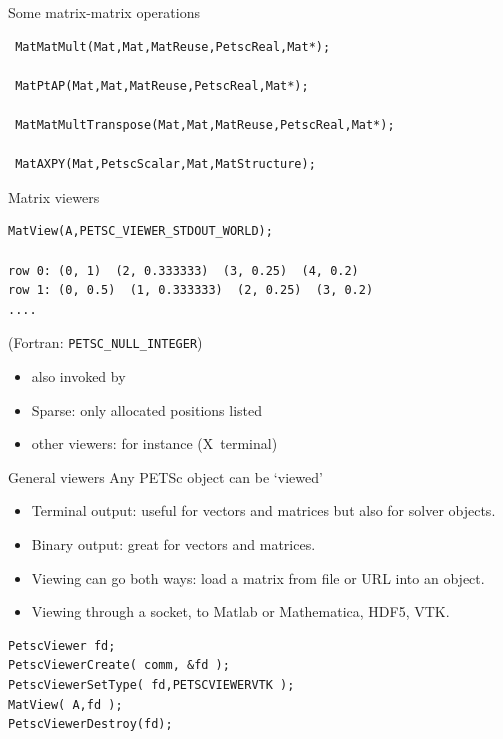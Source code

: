 \begin{longstory}

\begin{numberedframe}{Some matrix-matrix operations}
\begin{lstlisting}
 MatMatMult(Mat,Mat,MatReuse,PetscReal,Mat*);

 MatPtAP(Mat,Mat,MatReuse,PetscReal,Mat*);

 MatMatMultTranspose(Mat,Mat,MatReuse,PetscReal,Mat*);

 MatAXPY(Mat,PetscScalar,Mat,MatStructure);
\end{lstlisting}
\end{numberedframe}

\begin{details}
\begin{numberedframe}{Matrix viewers}
\begin{lstlisting}
MatView(A,PETSC_VIEWER_STDOUT_WORLD);

row 0: (0, 1)  (2, 0.333333)  (3, 0.25)  (4, 0.2)
row 1: (0, 0.5)  (1, 0.333333)  (2, 0.25)  (3, 0.2)
....
\end{lstlisting}
(Fortran: \lstinline{PETSC_NULL_INTEGER})
  \begin{itemize}
  \item also invoked by 
  \item Sparse: only allocated positions listed
  \item other viewers: for instance  (X~terminal)
  \end{itemize}
\end{numberedframe}
\end{details}

\begin{numberedframe}{General viewers}
  Any PETSc object can be `viewed'
  \begin{itemize}
  \item Terminal output: useful for vectors and matrices but also for
    solver objects.
  \item Binary output: great for vectors and matrices.
  \item Viewing can go both ways: load a matrix from file or URL into
    an object.
  \item Viewing through a socket, to Matlab or Mathematica, HDF5, VTK.
  \end{itemize}
\begin{lstlisting}
PetscViewer fd;
PetscViewerCreate( comm, &fd );
PetscViewerSetType( fd,PETSCVIEWERVTK );
MatView( A,fd );
PetscViewerDestroy(fd);
\end{lstlisting}
\end{numberedframe}

\end{longstory}

